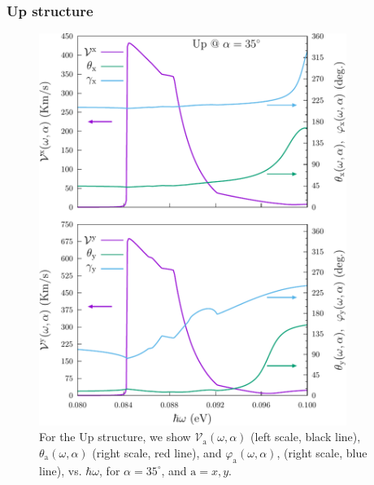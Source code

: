 \documentclass[floatfix,prb,aps,superscriptaddress,showpacs,11pt,preprint,letterpaper]{revtex4}
\def\tama{10cm}
\begin{document}
\subsubsection{Up structure}

\begin{figure}[t]
\centering
\includegraphics[width=\tama]{figures/fig7}
\caption{For the Up structure, we show
$\mathcal{V}_{\mathrm{a}} (\omega,\alpha)$ (left scale, black line),
$\theta_{\mathrm{a}} (\omega,\alpha)$ (right scale, red line), and
$\varphi_{\mathrm{a}} (\omega,\alpha)$, (right scale, blue line), vs.
$\hbar\omega$, for $\alpha=35^\circ$, and $\mathrm{a}=x,y$. }
\label{fig:up-vab-comp-rtp-1}
\end{figure}
\end{document}
